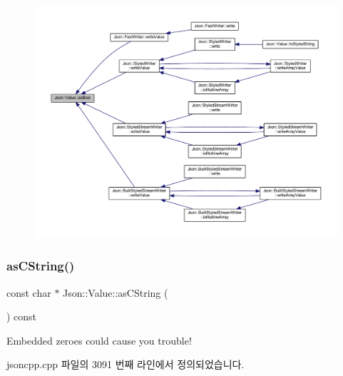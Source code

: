 \begin{figure}[H]
\begin{center}
\leavevmode
\includegraphics[width=350pt]{class_json_1_1_value_ab693fb7b9b1595bb0adc49658bbf780d_icgraph}
\end{center}
\end{figure}
\mbox{\label{class_json_1_1_value_a16668c8db7ef0a5de040012f0dfd84b0}} 
\subsubsection{\texorpdfstring{as\+C\+String()}{asCString()}}
{\footnotesize\ttfamily const char $\ast$ Json\+::\+Value\+::as\+C\+String (\begin{DoxyParamCaption}{ }\end{DoxyParamCaption}) const}



Embedded zeroes could cause you trouble! 



jsoncpp.\+cpp 파일의 3091 번째 라인에서 정의되었습니다.


